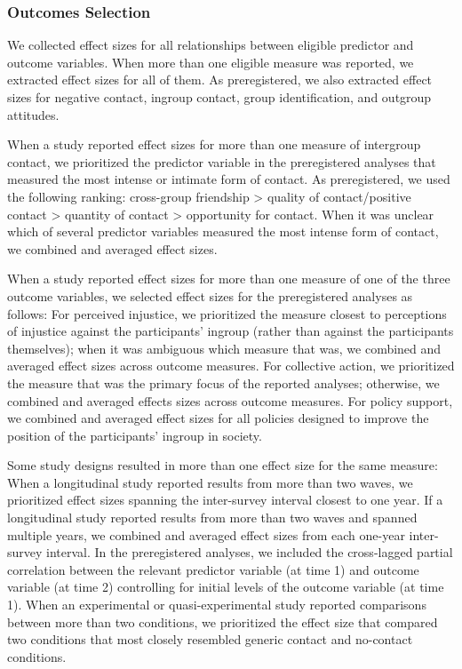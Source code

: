 \documentclass[12pt, letterpaper]{article}
\begin{document}
\hypertarget{outcomes-selection}{%
\subsubsection{Outcomes Selection}\label{outcomes-selection}}

We collected effect sizes for all relationships between eligible
predictor and outcome variables. When more than one eligible measure was
reported, we extracted effect sizes for all of them. As preregistered,
we also extracted effect sizes for negative contact, ingroup contact,
group identification, and outgroup attitudes.

When a study reported effect sizes for more than one measure of
intergroup contact, we prioritized the predictor variable in the
preregistered analyses that measured the most intense or intimate form
of contact. As preregistered, we used the following ranking: cross-group
friendship \textgreater{} quality of contact/positive contact
\textgreater{} quantity of contact \textgreater{} opportunity for
contact. When it was unclear which of several predictor variables
measured the most intense form of contact, we combined and averaged
effect sizes.

When a study reported effect sizes for more than one measure of one of
the three outcome variables, we selected effect sizes for the
preregistered analyses as follows: For perceived injustice, we
prioritized the measure closest to perceptions of injustice against the
participants' ingroup (rather than against the participants themselves);
when it was ambiguous which measure that was, we combined and averaged
effect sizes across outcome measures. For collective action, we
prioritized the measure that was the primary focus of the reported
analyses; otherwise, we combined and averaged effects sizes across
outcome measures. For policy support, we combined and averaged effect
sizes for all policies designed to improve the position of the
participants' ingroup in society.

Some study designs resulted in more than one effect size for the same
measure: When a longitudinal study reported results from more than two
waves, we prioritized effect sizes spanning the inter-survey interval
closest to one year. If a longitudinal study reported results from more
than two waves and spanned multiple years, we combined and averaged
effect sizes from each one-year inter-survey interval. In the
preregistered analyses, we included the cross-lagged partial correlation
between the relevant predictor variable (at time 1) and outcome variable
(at time 2) controlling for initial levels of the outcome variable (at
time 1). When an experimental or quasi-experimental study reported
comparisons between more than two conditions, we prioritized the effect
size that compared two conditions that most closely resembled generic
contact and no-contact conditions.
\end{document}
